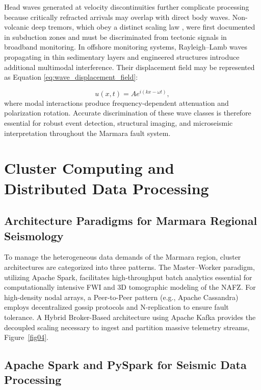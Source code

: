 \documentclass[data,article,accept,pdftex,moreauthors]{Definitions/mdpi}
\begin{document}
Head waves generated at velocity discontinuities further complicate processing because critically refracted arrivals may overlap with direct body waves. Non-volcanic deep tremors, which obey a distinct scaling law \cite{Ide2007}, were first documented in subduction zones \cite{Obara2002} and must be discriminated from tectonic signals in broadband monitoring. In offshore monitoring systems, Rayleigh--Lamb waves propagating in thin sedimentary layers and engineered structures introduce additional multimodal interference. Their displacement field may be represented as Equation \eqref{eq:wave_displacement_field}:

\begin{equation}
\label{eq:wave_displacement_field}
u(x,t) = A e^{i(kx-\omega t)},
\end{equation}
where modal interactions produce frequency-dependent attenuation and polarization rotation. Accurate discrimination of these wave classes is therefore essential for robust event detection, structural imaging, and microseismic interpretation throughout the Marmara \linebreak fault system.

\section{Cluster Computing and Distributed Data Processing}

\subsection{Architecture Paradigms for Marmara Regional Seismology}

To manage the heterogeneous data demands of the Marmara region, cluster architectures are categorized into three patterns. The Master--Worker paradigm, utilizing Apache Spark, facilitates high-throughput batch analytics essential for computationally intensive FWI and 3D tomographic modeling of the NAFZ. For high-density nodal arrays, a Peer-to-Peer pattern (e.g., Apache Cassandra) employs decentralized gossip protocols and N-replication to ensure fault tolerance. A Hybrid Broker-Based architecture using Apache Kafka provides the decoupled scaling necessary to ingest and partition massive telemetry streams, Figure~\ref{fig04}.

\subsection{Apache Spark and PySpark for Seismic Data Processing}
\end{document}
